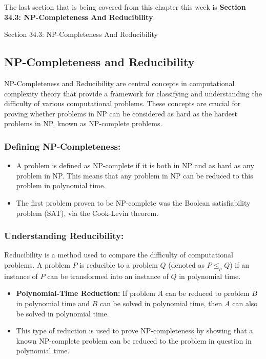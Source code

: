 The last section that is being covered from this chapter this week is \textbf{Section 34.3: NP-Completeness And Reducibility}.

\begin{notes}{Section 34.3: NP-Completeness And Reducibility}
    \subsection*{NP-Completeness and Reducibility}

    NP-Completeness and Reducibility are central concepts in computational complexity theory that provide a framework for classifying and understanding the difficulty of various computational problems. 
    These concepts are crucial for proving whether problems in NP can be considered as hard as the hardest problems in NP, known as NP-complete problems. \vspace*{1em}
    
    \subsubsection*{Defining NP-Completeness:}
    
    \begin{itemize}
        \item A problem is defined as NP-complete if it is both in NP and as hard as any problem in NP. This means that any problem in NP can be reduced to this problem in polynomial time.
        \item The first problem proven to be NP-complete was the Boolean satisfiability problem (SAT), via the Cook-Levin theorem.
    \end{itemize}
    
    \subsubsection*{Understanding Reducibility:}
    
    Reducibility is a method used to compare the difficulty of computational problems. A problem $P$ is reducible to a problem $Q$ (denoted as $P \leq_p Q$) if an instance of $P$ can be transformed 
    into an instance of $Q$ in polynomial time.
    
    \begin{itemize}
        \item \textbf{Polynomial-Time Reduction:} If problem $A$ can be reduced to problem $B$ in polynomial time and $B$ can be solved in polynomial time, then $A$ can also be solved in polynomial time.
        \item This type of reduction is used to prove NP-completeness by showing that a known NP-complete problem can be reduced to the problem in question in polynomial time.
    \end{itemize}
    

\end{notes}

